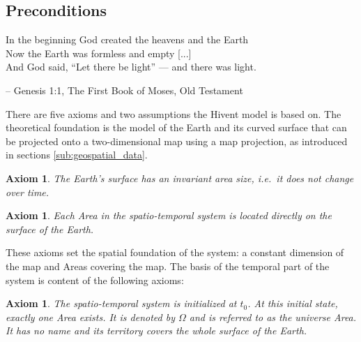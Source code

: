 

\subsection{Preconditions} %
\label{sub:preconditions}

\begin{quoteit}
  In the beginning God created the heavens and the Earth \\
  Now the Earth was formless and empty [...] \\
  And God said, “Let there be light” --- and there was light.
\end{quoteit}
\hfill -- Genesis 1:1, The First Book of Moses, Old Testament
\vspace{1em}


There are five axioms and two assumptions the Hivent model is based on. The theoretical foundation is the model of the Earth and its curved surface that can be projected onto a two-dimensional map using a map projection, as introduced in sections \ref{sub:geospatial_data}.

\newtheorem{invariant_surface}[assicounter]{Axiom}
\begin{invariant_surface}
\label{axm:invariant_surface}
  The Earth's surface has an invariant area size, i.e.\ it does not change over time.
\end{invariant_surface}

\vspace{-2.0em}
\newtheorem{area_on_surface}[assicounter]{Axiom}
\begin{area_on_surface}
\label{axm:area_on_surface}
  Each Area in the spatio-temporal system is located directly on the surface of the Earth.
\end{area_on_surface}

These axioms set the spatial foundation of the system: a constant dimension of the map and Areas covering the map. The basis of the temporal part of the system is content of the following axioms:

\vspace{-1.0em}
\newtheorem{initial_configuration}[assicounter]{Axiom}
\begin{initial_configuration}
\label{axm:initial_configuration}
  The spatio-temporal system is initialized at $t_0$. At this initial state, exactly one Area exists. It is denoted by $\Omega$ and is referred to as the \emph{universe} Area. It has no name and its territory covers the whole surface of the Earth.
\end{initial_configuration}

